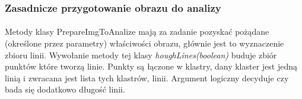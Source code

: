 \documentclass[a4paper,12pt]{article}
\begin{document}
		\subsubsection{Zasadnicze przygotowanie obrazu do analizy}
	        \paragraph{\indent} Metody klasy PrepareImgToAnalize mają za zadanie pozyskać pożądane (określone przez parametry) właściwości obrazu, głównie jest to wyznaczenie zbioru     linii. Wywołanie metody tej klasy \textit{houghLines(boolean)} buduje zbiór          punktów  które tworzą linie. Punkty są łączone w klastry, dany klaster      jest jedną linią i zwracana jest lista tych klastrów, linii. Argument       logiczny decyduje czy bada się dodatkowo długość linii.
    		
\end{document}

